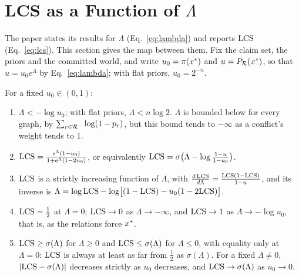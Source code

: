\section{LCS as a Function of \texorpdfstring{$\Lambda$}{Lambda}}
\label{app:lcs-lambda}

The paper states its results for $\Lambda$ (Eq.~\ref{eq:lambda}) and reports $\mathrm{LCS}$
(Eq.~\ref{eq:lcs}). This section gives the map between them. Fix the claim set, the priors and the
committed world, and write $u_0=\pi(x^{\ast})$ and $u=P_{\mathcal{R}}(x^{\ast})$, so that $u=u_0e^{\Lambda}$ by
Eq.~\ref{eq:lambda}; with flat priors, $u_0=2^{-n}$.

\begin{proposition}
\label{prop:lcs-lambda}
For a fixed $u_0\in(0,1)$:
\begin{enumerate}[label=(\roman*),leftmargin=1.6em,itemsep=1pt,topsep=2pt]
\item $\Lambda<-\log u_0$; with flat priors, $\Lambda<n\log2$. $\Lambda$ is bounded below for every
  graph, by $\sum_{r\in\mathcal{R}^{-}}\log(1-p_r)$, but this bound tends to $-\infty$ as a conflict's weight
  tends to $1$.
\item $\mathrm{LCS}=\frac{e^{\Lambda}(1-u_0)}{1+e^{\Lambda}(1-2u_0)}$, or equivalently
  $\mathrm{LCS}=\sigma\bigl(\Lambda-\log\frac{1-u}{1-u_0}\bigr)$.
\item $\mathrm{LCS}$ is a strictly increasing function of $\Lambda$, with
  $\frac{d\,\mathrm{LCS}}{d\Lambda}=\frac{\mathrm{LCS}(1-\mathrm{LCS})}{1-u}$, and its inverse is
  $\Lambda=\log\mathrm{LCS}-\log\bigl[(1-\mathrm{LCS})-u_0(1-2\mathrm{LCS})\bigr]$.
\item $\mathrm{LCS}=\frac12$ at $\Lambda=0$; $\mathrm{LCS}\to0$ as $\Lambda\to-\infty$, and $\mathrm{LCS}\to1$ as
  $\Lambda\to-\log u_0$, that is, as the relations force $x^{\ast}$.
\item $\mathrm{LCS}\ge\sigma(\Lambda)$ for $\Lambda\ge0$ and $\mathrm{LCS}\le\sigma(\Lambda)$ for $\Lambda\le0$,
  with equality only at $\Lambda=0$: $\mathrm{LCS}$ is always at least as far from $\frac12$ as
  $\sigma(\Lambda)$. For a fixed $\Lambda\ne0$, $|\mathrm{LCS}-\sigma(\Lambda)|$ decreases strictly as $u_0$
  decreases, and $\mathrm{LCS}\to\sigma(\Lambda)$ as $u_0\to0$.
\end{enumerate}
\end{proposition}


